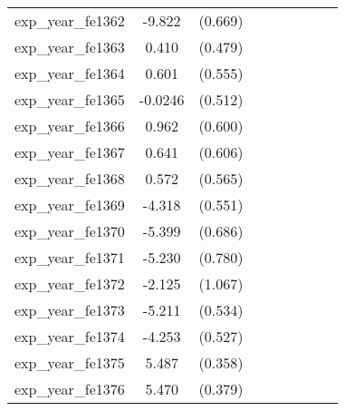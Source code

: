 {\begin{tabular}{l*{4}{cc}}
exp\_year\_fe1362&   -9.822\sym{***}&  (0.669)&                  &         &                  &         &                  &         \\
exp\_year\_fe1363&    0.410         &  (0.479)&                  &         &                  &         &                  &         \\
exp\_year\_fe1364&    0.601         &  (0.555)&                  &         &                  &         &                  &         \\
exp\_year\_fe1365&  -0.0246         &  (0.512)&                  &         &                  &         &                  &         \\
exp\_year\_fe1366&    0.962         &  (0.600)&                  &         &                  &         &                  &         \\
exp\_year\_fe1367&    0.641         &  (0.606)&                  &         &                  &         &                  &         \\
exp\_year\_fe1368&    0.572         &  (0.565)&                  &         &                  &         &                  &         \\
exp\_year\_fe1369&   -4.318\sym{***}&  (0.551)&                  &         &                  &         &                  &         \\
exp\_year\_fe1370&   -5.399\sym{***}&  (0.686)&                  &         &                  &         &                  &         \\
exp\_year\_fe1371&   -5.230\sym{***}&  (0.780)&                  &         &                  &         &                  &         \\
exp\_year\_fe1372&   -2.125\sym{*}  &  (1.067)&                  &         &                  &         &                  &         \\
exp\_year\_fe1373&   -5.211\sym{***}&  (0.534)&                  &         &                  &         &                  &         \\
exp\_year\_fe1374&   -4.253\sym{***}&  (0.527)&                  &         &                  &         &                  &         \\
exp\_year\_fe1375&    5.487\sym{***}&  (0.358)&                  &         &                  &         &                  &         \\
exp\_year\_fe1376&    5.470\sym{***}&  (0.379)&                  &         &                  &         &                  &         \\

\end{tabular}}
